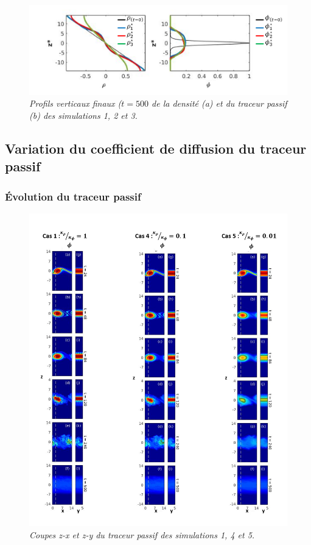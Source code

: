 \documentclass[a4paper,12pt]{article}
\begin{document}
    \begin{figure}[!h]
        \centering
        \includegraphics[width=1\linewidth]{figures/rhodiff_profils_fin.png}
        \caption{\textit{Profils verticaux finaux ($t=500$ de la densité (a) et du traceur passif (b) des simulations 1, 2 et 3.}}
        \label{rhodiff_profils_Krho}
    \end{figure}
    
    
  \subsection{Variation du coefficient de diffusion du traceur passif}
  
    \subsubsection{Évolution du traceur passif}
    
    \begin{figure}[!h]
        \centering
        \includegraphics[width=0.90\linewidth]{figures/phidiff_contour.png}
        \caption{\textit{Coupes z-x et z-y du traceur passif des simulations 1, 4 et 5.}}
        \label{phidiff}
    \end{figure}
    
\end{document}
